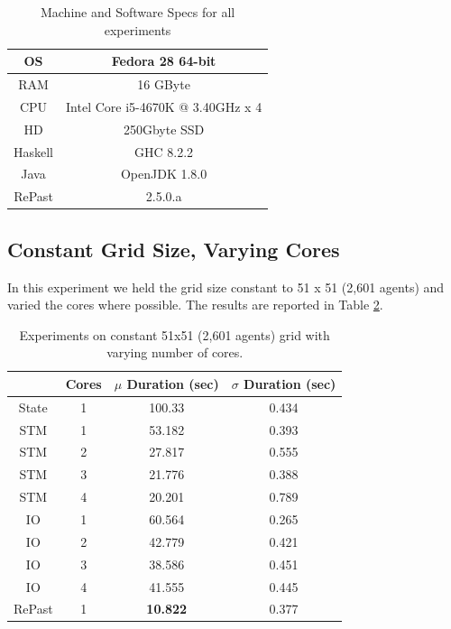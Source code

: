 \begin{table}
	\centering
	\begin{tabular}{ c || c }
		OS & Fedora 28 64-bit \\ \hline
		RAM & 16 GByte \\ \hline
		CPU & Intel Core i5-4670K @ 3.40GHz x 4 \\ \hline
		HD & 250Gbyte SSD \\ \hline
		Haskell & GHC 8.2.2 \\ \hline
		Java & OpenJDK 1.8.0 \\ \hline
		RePast & 2.5.0.a
	\end{tabular}
	
	\caption{Machine and Software Specs for all experiments}
	\label{tab:machine_specs}
\end{table}

\subsection{Constant Grid Size, Varying Cores}
In this experiment we held the grid size constant to 51 x 51 (2,601 agents) and varied the cores where possible. The results are reported in Table \ref{tab:constgrid_varyingcores}.

\begin{table}
	\centering
  	\begin{tabular}{ c || c | c | c }
               & Cores & $\mu$ Duration (sec) & $\sigma$ Duration (sec) \\ \hline \hline 
    	State  & 1     & 100.33               & 0.434 \\ \hline \hline
   		STM    & 1     & 53.182               & 0.393 \\ \hline
   		STM    & 2     & 27.817               & 0.555 \\ \hline
   		STM    & 3     & 21.776               & 0.388 \\ \hline
   		STM    & 4     & 20.201               & 0.789 \\ \hline \hline
   		IO     & 1     & 60.564               & 0.265 \\ \hline 
   		IO     & 2     & 42.779               & 0.421 \\ \hline 
   		IO     & 3     & 38.586               & 0.451 \\ \hline 
   		IO     & 4     & 41.555               & 0.445 \\ \hline \hline
   		RePast & 1     & \textbf{10.822}      & 0.377 \\ \hline 
  	\end{tabular}
  	
  	\caption{Experiments on constant 51x51 (2,601 agents) grid with varying number of cores.}
	\label{tab:constgrid_varyingcores}
\end{table}

